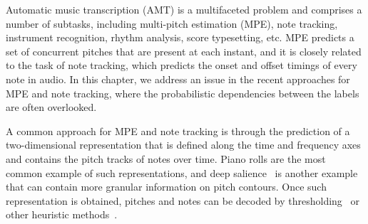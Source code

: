 Automatic music transcription (AMT) is a multifaceted problem and comprises a number of subtasks, including multi-pitch estimation (MPE), note tracking, instrument recognition, rhythm analysis, score typesetting, etc.
MPE predicts a set of concurrent pitches that are present at each instant, and it is closely related to the task of note tracking, which predicts the onset and offset timings of every note in audio.
In this chapter, we address an issue in the recent approaches for MPE and note tracking, where the probabilistic dependencies between the labels are often overlooked.

A common approach for MPE and note tracking is through the prediction of a two-dimensional representation that is defined along the time and frequency axes and contains the pitch tracks of notes over time.
Piano rolls %
are the most common example of such representations, and deep salience~\cite{bittner2017deepsalience} %
is another example that can contain more granular information on pitch contours.
Once such representation is obtained, pitches and notes can be decoded by thresholding~\cite{kelz2016framewise} or other heuristic methods~\cite{kim2018crepe,hawthorne2018onsetsframes}.


